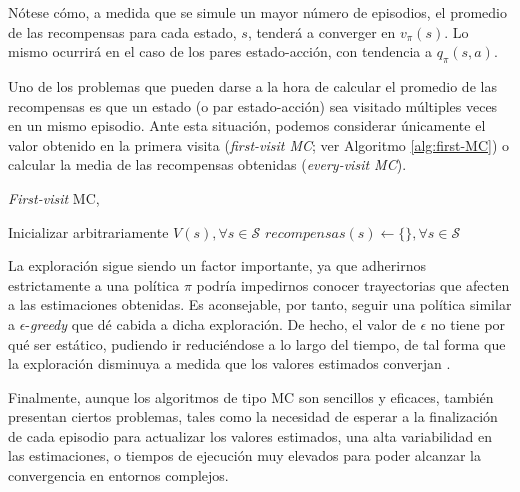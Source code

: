 Nótese cómo, a medida que se simule un mayor número de episodios, el promedio de las recompensas para cada estado, $s$, tenderá a converger en $v_\pi(s)$. Lo mismo ocurrirá en el caso de los pares estado-acción, con tendencia a $q_\pi(s,a)$.

Uno de los problemas que pueden darse a la hora de calcular el promedio de las recompensas es que un estado (o par estado-acción) sea visitado múltiples veces en un mismo episodio. Ante esta situación, podemos considerar únicamente el valor obtenido en la primera visita (\textit{first-visit MC}; ver Algoritmo \ref{alg:first-MC}) o calcular la media de las recompensas obtenidas (\textit{every-visit MC}).

\begin{algorithm}
\caption{\textit{First-visit} MC, \cite{zhang2020taxonomy}}
\label{alg:first-MC}
\DontPrintSemicolon
\LinesNumbered
{}

Inicializar arbitrariamente $V(s), \forall s \in \mathcal{S}$\;
$recompensas(s) \leftarrow \{ \}, \forall s \in \mathcal{S}$\;

\end{algorithm}

La exploración sigue siendo un factor importante, ya que adherirnos estrictamente a una política $\pi$ podría impedirnos conocer trayectorias que afecten a las estimaciones obtenidas. Es aconsejable, por tanto, seguir una política similar a $\epsilon$-\textit{greedy} que dé cabida a dicha exploración. De hecho, el valor de $\epsilon$ no tiene por qué ser estático, pudiendo ir reduciéndose a lo largo del tiempo, de tal forma que la exploración disminuya a medida que los valores estimados converjan \cite{morales2020grokking}.

Finalmente, aunque los algoritmos de tipo MC son sencillos y eficaces, también presentan ciertos problemas, tales como la necesidad de esperar a la finalización de cada episodio para actualizar los valores estimados, una alta variabilidad en las estimaciones, o tiempos de ejecución muy elevados para poder alcanzar la convergencia en entornos complejos.


